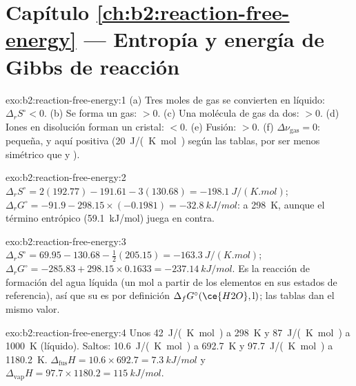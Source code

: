 \section*{Capítulo \ref{ch:b2:reaction-free-energy} --- Entropía y energía de Gibbs de reacción}

\begin{solution}{exo:b2:reaction-free-energy:1}
(a) Tres moles de gas se convierten en líquido: $\Delta_r S^\circ < 0$. (b) Se forma
un gas: $> 0$. (c) Una molécula de gas da dos: $> 0$. (d) Iones en disolución
forman un cristal: $< 0$. (e) Fusión: $> 0$. (f) $\Delta\nu_{\text{gas}} = 0$:
pequeña, y aquí positiva (\qty{+20}{J/(K.mol)} según las tablas, por ser 
menos simétrico que  y ).
\end{solution}

\begin{solution}{exo:b2:reaction-free-energy:2}
$\Delta_r S^\circ = 2(192.77) - 191.61 - 3(130.68) = \qty{-198.1}{J/(K.mol)}$;
$\Delta_r G^\circ = -91.9 - 298.15 \times (-0.1981) = \qty{-32.8}{kJ/mol}$:
 a \qty{298}{K}, aunque el término entrópico (\qty{+59.1}{kJ/mol})
juega en contra.
\end{solution}

\begin{solution}{exo:b2:reaction-free-energy:3}
$\Delta_r S^\circ = 69.95 - 130.68 - \tfrac12(205.15) = \qty{-163.3}{J/(K.mol)}$;
$\Delta_r G^\circ = -285.83 + 298.15 \times 0.1633 = \qty{-237.14}{kJ/mol}$.
Es la reacción de formación del agua líquida (un mol a partir de los elementos en
sus estados de referencia), así que su  es por
definición $\Delta_f G^\circ(\ce{H2O}, \text{l})$; las tablas dan el mismo
valor.
\end{solution}

\begin{solution}{exo:b2:reaction-free-energy:4}
Unos \qty{42}{J/(K.mol)} a \qty{298}{K} y \qty{87}{J/(K.mol)} a
\qty{1000}{K} (líquido). Saltos: \qty{10.6}{J/(K.mol)} a \qty{692.7}{K} y
\qty{97.7}{J/(K.mol)} a \qty{1180.2}{K}. $\Delta_{\text{fus}}H = 10.6 \times
692.7 = \qty{7.3}{kJ/mol}$ y $\Delta_{\text{vap}}H = 97.7 \times 1180.2 =
\qty{115}{kJ/mol}$.
\end{solution}

